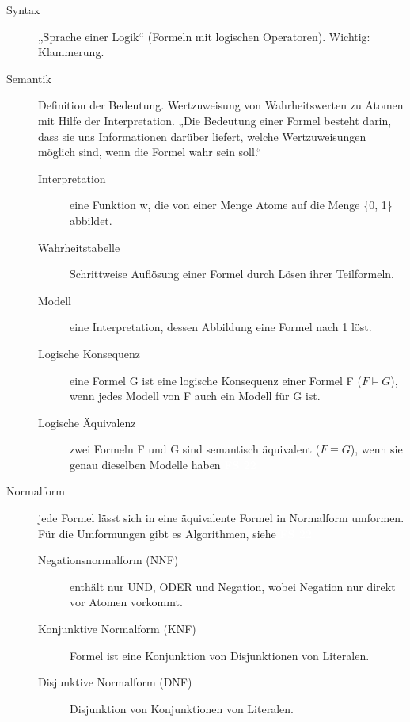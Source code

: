 \documentclass[a4paper,10pt]{article}
\newcommand{\vl}[1]{\colorbox{vl}{\textcolor{white}{\small\textbf{#1}}}}
\begin{document}
\begin{description}
            \item[Syntax] „Sprache einer Logik“ (Formeln mit logischen Operatoren). Wichtig: Klammerung.
            \item[Semantik] Definition der Bedeutung. Wertzuweisung von Wahrheitswerten zu Atomen mit Hilfe der Interpretation.
                „Die Bedeutung einer Formel besteht darin, dass sie uns Informationen darüber liefert, welche Wertzuweisungen möglich sind, wenn die Formel wahr sein soll.“
                \begin{description}
                    \item[Interpretation] eine Funktion w, die von einer Menge Atome auf die Menge \{0, 1\} abbildet.
                    \item[Wahrheitstabelle] Schrittweise Auflösung einer Formel durch Lösen ihrer Teilformeln.
                    \item[Modell] eine Interpretation, dessen Abbildung eine Formel nach 1 löst.
                    \item[Logische Konsequenz] eine Formel G ist eine logische Konsequenz einer Formel F ($F \models G$), wenn jedes Modell von F auch ein Modell für G ist.
                    \item[Logische Äquivalenz] zwei Formeln F und G sind semantisch äquivalent ($F \equiv G$), wenn sie genau dieselben Modelle haben \vl{FS 22}
                \end{description}

            \item[Normalform] jede Formel lässt sich in eine äquivalente Formel in Normalform umformen. \\ Für die Umformungen gibt es Algorithmen, siehe \vl{FS 22}
                \begin{description}
                    \item[Negationsnormalform (NNF)] enthält nur UND, ODER und Negation, wobei Negation nur direkt vor Atomen vorkommt.
                    \item[Konjunktive Normalform (KNF)] Formel ist eine Konjunktion von Disjunktionen von Literalen.
                    \item[Disjunktive Normalform (DNF)] Disjunktion von Konjunktionen von Literalen.
                \end{description}


        \end{description}
\end{document}
